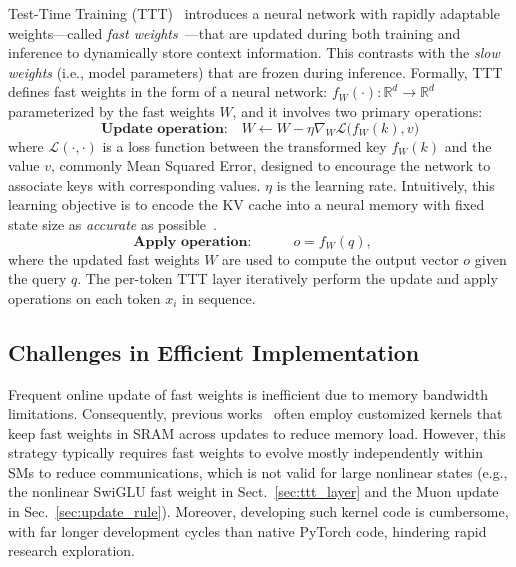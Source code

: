 \documentclass{article}
\begin{document}
Test-Time Training (TTT)~\cite{sun2024learning} introduces a neural network with rapidly adaptable weights---called \textit{fast weights}~\cite{schlag2021linear}---that are updated during 
both training and inference to dynamically store context information. 
This contrasts with the \textit{slow weights} (i.e., model parameters) that are frozen during inference.
Formally, TTT defines fast weights in the form of a neural network:
$f_W(\cdot): \mathbb{R}^d \rightarrow \mathbb{R}^d$ parameterized by the fast weights $W$,  and it involves two primary operations:
\begin{equation}
\textbf{Update operation:} \quad W \leftarrow W - \eta \nabla_{W} \mathcal{L}\big(f_W(k), v\big)
\label{eq:ttt_update}
\end{equation}
where $\mathcal{L}(\cdot,\cdot)$ is a loss function between the transformed key  $f_W(k)$ and the value $v$, commonly Mean Squared Error, designed to encourage the network to associate keys with corresponding values. 
$\eta$ is the learning rate.
Intuitively, this learning objective is to encode the KV cache into a neural memory with fixed state size as \emph{accurate} as possible~\cite{wang2025testtimeregressionunifyingframework}.
\begin{equation}
\textbf{Apply operation:}\quad \quad \quad
o = f_W(q),\quad 
\label{eq:ttt_apply}
\end{equation}
where the updated fast weights $W$ are used to compute the output vector $o$ given the query $q$.
The per-token TTT layer iteratively perform the update and apply operations on each token $x_i$ in sequence.

\subsection{Challenges in Efficient Implementation}
\label{sec:efficiency_challenge}

Frequent online update of fast weights is inefficient due to memory bandwidth limitations. Consequently, previous works~\cite{sun2023retentive, gu2023mamba, yang2024gated, qinvarious, yangparallelizing} often employ customized kernels that keep fast weights in SRAM across updates to reduce memory load. 
However, this strategy typically requires fast weights to evolve mostly independently within SMs to reduce communications, which is not valid for large nonlinear states (e.g., the nonlinear SwiGLU fast weight in Sect.~\ref{sec:ttt_layer} and the Muon update in Sec.~\ref{sec:update_rule}).   Moreover, developing such kernel code is cumbersome, with far longer development cycles than native PyTorch code, hindering rapid research exploration.
\end{document}
